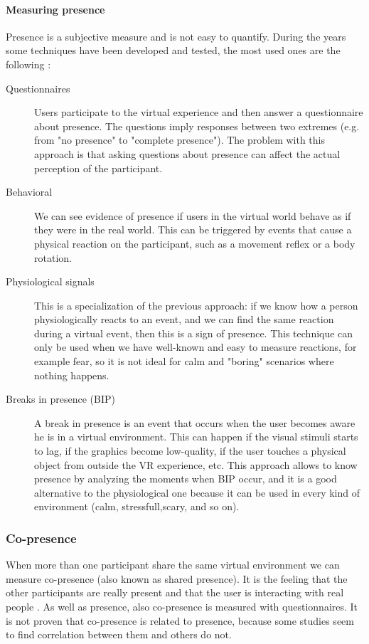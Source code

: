 \documentclass[binding=0.6cm,LaM]{sapthesis}
\begin{document}
\paragraph{Measuring presence}
Presence is a subjective measure and is not easy to quantify. During the years some techniques have been developed and tested, the most used ones are the following \cite{sanchez2005presence}:

\begin{description}

\item [Questionnaires]
Users participate to the virtual experience and then answer a questionnaire about presence. The questions imply responses between two extremes (e.g. from "no presence" to "complete presence"). The problem with this approach is that asking questions about presence can affect the actual perception of the participant.

\item [Behavioral]
We can see evidence of presence if users in the virtual world behave as if they were in the real world. This can be triggered by events that cause a physical reaction on the participant, such as a movement reflex or a body rotation.

\item [Physiological signals]
This is a specialization of the previous approach: if we know how a person physiologically reacts to an event, and we can find the same reaction during a virtual event, then this is a sign of presence. This technique can only be used when we have well-known and easy to measure reactions, for example fear, so it is not ideal for calm and "boring" scenarios where nothing happens.

\item [Breaks in presence (BIP)]
A break in presence is an event that occurs when the user becomes aware he is in a virtual environment. This can happen if the visual stimuli starts to lag, if the graphics become low-quality, if the user touches a physical object from outside the VR experience, etc. This approach allows to know presence by analyzing the moments when BIP occur, and it is a good alternative to the physiological one because it can be used in every kind of environment (calm, stressfull,scary, and so on).

\end{description}

\subsubsection{Co-presence}
When more than one participant share the same virtual environment we can measure co-presence (also known as shared presence). It is the feeling that the other participants are really present and that the user is interacting with real people \cite{casanueva2001effects}. As well as presence, also co-presence is measured with questionnaires. It is not proven that co-presence is related to presence, because some studies \cite{tromp1998small, slater2000small} seem to find correlation between them and others \cite{casanueva2001effects} do not.
\end{document}
